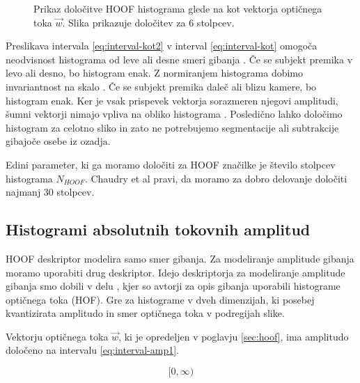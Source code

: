 \begin{figure}[htb]
\centering

\caption[Prikaz določitve HOOF histograma glede na kot vektorja]{Prikaz določitve HOOF histograma glede na kot vektorja optičnega toka $\vec{w}$. Slika prikazuje določitev za $6$ stolpcev.}
\label{fig:hoof-histogram}
\end{figure}




Preslikava intervala \eqref{eq:interval-kot2} v interval \eqref{eq:interval-kot} omogoča neodvisnost histograma od leve ali desne smeri gibanja \cite{chaudhry2009histograms}. Če se subjekt premika v levo ali desno, bo histogram enak. Z normiranjem histograma dobimo invariantnost na skalo \cite{chaudhry2009histograms}. Če se subjekt premika daleč ali blizu kamere, bo histogram enak. Ker je vsak prispevek vektorja sorazmeren njegovi amplitudi, šumni vektorji nimajo vpliva na obliko histograma \cite{chaudhry2009histograms}. Posledično lahko določimo histogram za celotno sliko in zato ne potrebujemo segmentacije ali subtrakcije gibajoče osebe iz ozadja. 

Edini parameter, ki ga moramo določiti za HOOF značilke je število stolpcev histograma $N_{HOOF}$. Chaudry et al \cite{chaudhry2009histograms} pravi, da moramo za dobro delovanje določiti najmanj $30$ stolpcev. 







\subsection{Histogrami absolutnih tokovnih amplitud}\label{sec:hafa}
HOOF deskriptor modelira samo smer gibanja. Za modeliranje amplitude gibanja moramo uporabiti drug deskriptor. Idejo deskriptorja za modeliranje amplitude gibanja smo dobili v delu \cite{pers2010histograms}, kjer so avtorji za opis gibanja uporabili histograme optičnega toka (HOF). Gre za histograme v dveh dimenzijah, ki posebej kvantizirata amplitudo in smer optičnega toka v podregijah slike. 

Vektorju optičnega toka $\vec{w}$, ki je opredeljen v poglavju \ref{sec:hoof}, ima amplitudo določeno na intervalu \eqref{eq:interval-amp1}. 

\begin{equation}\label{eq:interval-amp1}
	[0, \infty)
\end{equation}


